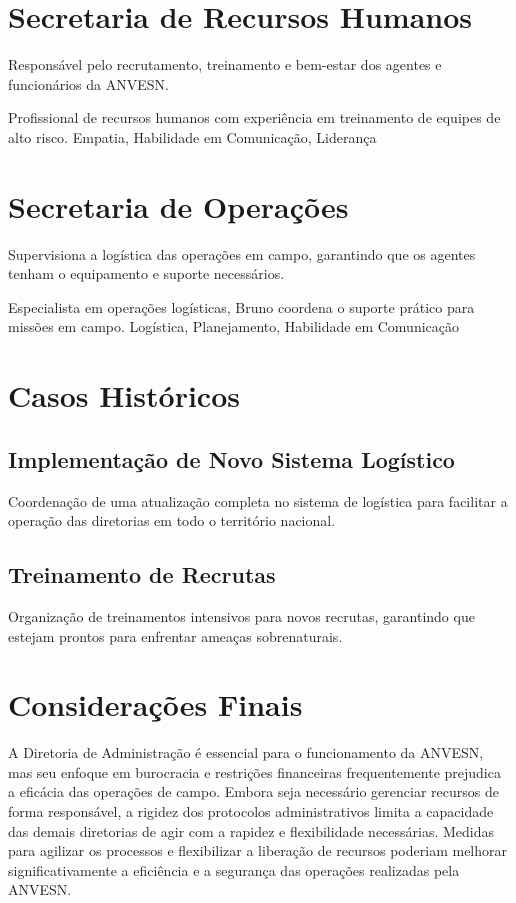 \section{Secretaria de Recursos Humanos}
Responsável pelo recrutamento, treinamento e bem-estar dos agentes e funcionários da ANVESN.

{Profissional de recursos humanos com experiência em treinamento de equipes de alto risco.}
{Empatia, Habilidade em Comunicação, Liderança}

\section{Secretaria de Operações}
Supervisiona a logística das operações em campo, garantindo que os agentes tenham o equipamento e suporte necessários.

{Especialista em operações logísticas, Bruno coordena o suporte prático para missões em campo.}
{Logística, Planejamento, Habilidade em Comunicação}

\section{Casos Históricos}

\subsection{Implementação de Novo Sistema Logístico} Coordenação de uma atualização completa no sistema de logística para facilitar a operação das diretorias em todo o território nacional.

\subsection{Treinamento de Recrutas} Organização de treinamentos intensivos para novos recrutas, garantindo que estejam prontos para enfrentar ameaças sobrenaturais.

\section{Considerações Finais}

A Diretoria de Administração é essencial para o funcionamento da ANVESN, mas seu enfoque em burocracia e restrições financeiras frequentemente prejudica a eficácia das operações de campo. Embora seja necessário gerenciar recursos de forma responsável, a rigidez dos protocolos administrativos limita a capacidade das demais diretorias de agir com a rapidez e flexibilidade necessárias. Medidas para agilizar os processos e flexibilizar a liberação de recursos poderiam melhorar significativamente a eficiência e a segurança das operações realizadas pela ANVESN.


